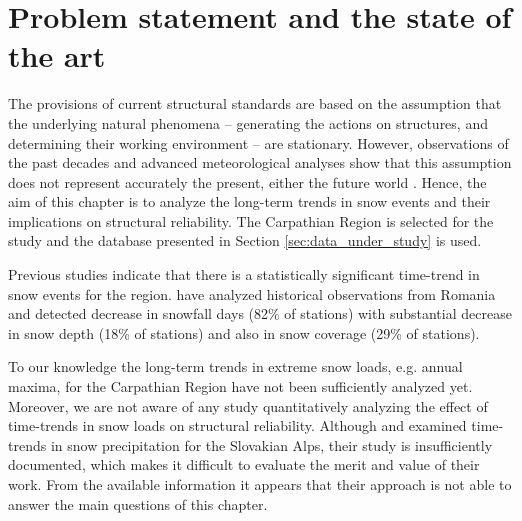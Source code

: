 \section{Problem statement and the state of the art}

The provisions of current structural standards are based on the assumption that the underlying natural phenomena -- generating the actions on structures, and determining their working environment -- are stationary. However, observations of the past decades and advanced meteorological analyses show that this assumption does not represent accurately the present, either the future world \citep{IPCC2012extremes, Milly2008, Herring2015}. Hence, the aim of this chapter is to analyze the long-term trends in snow events and their implications on structural reliability. The Carpathian Region is selected for the study and the database presented in Section \ref{sec:data_under_study} is used.

Previous studies indicate that there is a statistically significant time-trend in snow events for the region. \citet{Birsan2014} have analyzed historical observations from Romania and detected decrease in snowfall days (82\% of stations) with substantial decrease in snow depth (18\% of stations) and also in snow coverage (29\% of stations). 


To our knowledge the long-term trends in extreme snow loads, e.g. annual maxima, for the Carpathian Region have not been sufficiently analyzed yet. Moreover, we are not aware of any study quantitatively analyzing the effect of time-trends in snow loads on structural reliability.  Although \citet{Pecho2009} and \citet{Sadovsky2007} examined time-trends in snow precipitation for the Slovakian Alps, their study is insufficiently documented, which  makes it difficult to evaluate the merit and value of their work. From the available information it appears that their approach  is not able to answer the main questions of this chapter.

